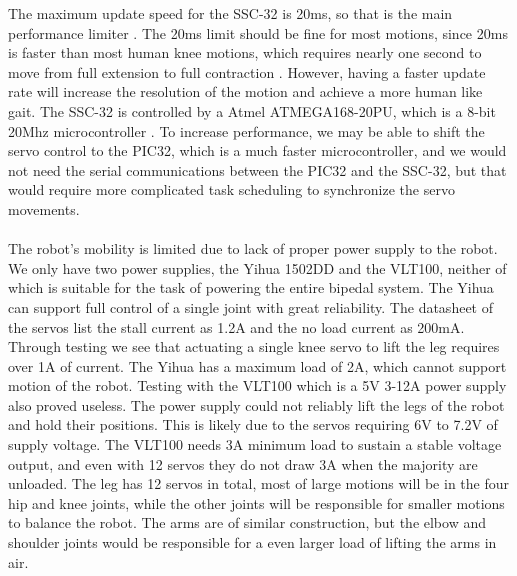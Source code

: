\documentclass[titlepage,letterpaper,12pt]{article}
\begin{document}
The maximum update speed for the SSC-32 is 20ms, so that is the main performance
limiter \cite{lynxmaxspeed}. The 20ms limit should be fine for most motions,
since 20ms is faster than most human knee motions, which requires nearly one
second to move from full extension to full contraction
\cite{williamson2001detecting}. However, having a faster update rate will
increase the resolution of the motion and achieve a more human like gait. The
SSC-32 is controlled by a Atmel ATMEGA168-20PU, which is a 8-bit 20Mhz
microcontroller \cite{Atmega168data}. To increase performance, we may be able to
shift the servo control to the PIC32, which is a much faster microcontroller,
and we would not need the serial communications between the PIC32 and the
SSC-32, but that would require more complicated task scheduling to synchronize
the servo movements.

\paragraph{}The robot's mobility is limited due to lack of
proper power supply to the robot. We only have two power supplies, the
Yihua 1502DD and the VLT100, neither of which is suitable for the task of
powering the entire bipedal system. The Yihua can support full control
of a single joint with great reliability. The datasheet of the servos list the
stall current as 1.2A and the no load current as 200mA. Through testing we see
that actuating a single knee servo to lift the leg requires over 1A of current.
The Yihua has a maximum load of 2A, which cannot support motion of the robot.
Testing with the VLT100 which is a 5V 3-12A power supply also proved useless.
The power supply could not reliably lift the legs of the robot and hold their
positions. This is likely due to the servos requiring 6V to 7.2V of supply
voltage. The VLT100 needs 3A minimum load to sustain a stable voltage output,
and even with 12 servos they do not draw 3A when the majority are unloaded. The
leg has 12 servos in total, most of large motions will be in the four hip and
knee joints, while the other joints will be responsible for smaller motions to
balance the robot.  The arms are of similar construction, but the elbow and
shoulder joints would be responsible for a even larger load of lifting the arms
in air. 
\end{document}
